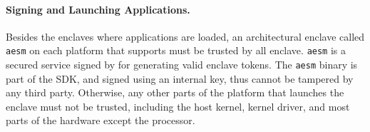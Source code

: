 
\paragraph{Signing and Launching Applications.}
Besides the enclaves where applications are loaded,
an architectural enclave called {\tt aesm} on each platform that supports \sgx{}
must be trusted by all enclave.
{\tt aesm} is a secured service signed by \intel{} for generating
valid enclave tokens.
The {\tt aesm} binary is part of the \sgx{} SDK,
and signed using an \intel{} internal key, thus cannot be
tampered by any third party.
Otherwise, any other parts of the platform that launches the enclave
must not be trusted, including the host kernel,
\sgx{} kernel driver, and most parts of the hardware except the processor.

%
%
%
%
%
%
%

